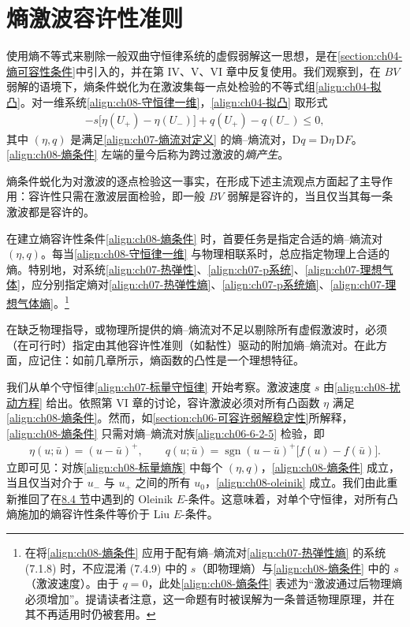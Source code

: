 \documentclass[../../main.tex]{subfiles}
\begin{document}
\section{熵激波容许性准则}\label{section:ch08-熵激波容许性准则}

使用熵不等式来剔除一般双曲守恒律系统的虚假弱解这一思想，是在\cref{section:ch04-熵可容性条件}中引入的，并在第 IV、V、VI 章中反复使用。我们观察到，在 $BV$ 弱解的语境下，熵条件蜕化为在激波集每一点处检验的不等式组\eqref{align:ch04-拟凸}。对一维系统\eqref{align:ch08-守恒律一维}，\eqref{align:ch04-拟凸} 取形式
\begin{align}
-s\big[\eta(U_+)-\eta(U_-)\big]+q(U_+)-q(U_-)\leqslant0,
\label{align:ch08-熵条件}
\end{align}
其中 $(\eta,q)$ 是满足\eqref{align:ch07-熵流对定义} 的熵--熵流对，$\mathrm{D}q=\mathrm{D}\eta\,\mathrm{D}F$。\eqref{align:ch08-熵条件} 左端的量今后称为跨过激波的\emph{熵产生}。

熵条件蜕化为对激波的逐点检验这一事实，在形成下述主流观点方面起了主导作用：容许性只需在激波层面检验，即一般 $BV$ 弱解是容许的，当且仅当其每一条激波都是容许的。

在建立熵容许性条件\eqref{align:ch08-熵条件} 时，首要任务是指定合适的熵--熵流对 $(\eta,q)$。每当\eqref{align:ch08-守恒律一维} 与物理相联系时，总应指定物理上合适的熵。特别地，对系统\eqref{align:ch07-热弹性}、\eqref{align:ch07-p系统}、\eqref{align:ch07-理想气体}，应分别指定熵对\eqref{align:ch07-热弹性熵}、\eqref{align:ch07-p系统熵}、\eqref{align:ch07-理想气体熵}。\footnote{在将\eqref{align:ch08-熵条件} 应用于配有熵--熵流对\eqref{align:ch07-热弹性熵} 的系统 (7.1.8) 时，不应混淆 (7.4.9) 中的 $s$（即物理熵）与\eqref{align:ch08-熵条件} 中的 $s$（激波速度）。由于 $q=0$，此处\eqref{align:ch08-熵条件} 表述为“激波通过后物理熵必须增加”。提请读者注意，这一命题有时被误解为一条普适物理原理，并在其不再适用时仍被套用。}

在缺乏物理指导，或物理所提供的熵--熵流对不足以剔除所有虚假激波时，必须（在可行时）指定由其他容许性准则（如黏性）驱动的附加熵--熵流对。在此方面，应记住：如前几章所示，熵函数的凸性是一个理想特征。

我们从单个守恒律\eqref{align:ch07-标量守恒律} 开始考察。激波速度 $s$ 由\eqref{align:ch08-扰动方程} 给出。依照第 VI 章的讨论，容许激波必须对所有凸函数 $\eta$ 满足\eqref{align:ch08-熵条件}。然而，如\cref{section:ch06-可容许弱解稳定性}所解释，\eqref{align:ch08-熵条件} 只需对熵--熵流对族\eqref{align:ch06-6-2-5} 检验，即
\begin{align}
\eta(u;\bar u)=(u-\bar u)^+,\qquad q(u;\bar u)=\operatorname{sgn}(u-\bar u)^+\big[f(u)-f(\bar u)\big].
\label{align:ch08-标量熵族}
\end{align}
立即可见：对族\eqref{align:ch08-标量熵族} 中每个 $(\eta,q)$，\eqref{align:ch08-熵条件} 成立，当且仅当对介于 $u_-$ 与 $u_+$ 之间的所有 $u_0$，\eqref{align:ch08-oleinik} 成立。我们由此重新推回了在\hyperref[section:ch08-liu容许性准则]{8.4 节}中遇到的 Oleinik $E$-条件。这意味着，对单个守恒律，对所有凸熵施加的熵容许性条件等价于 Liu $E$-条件。
\end{document}

